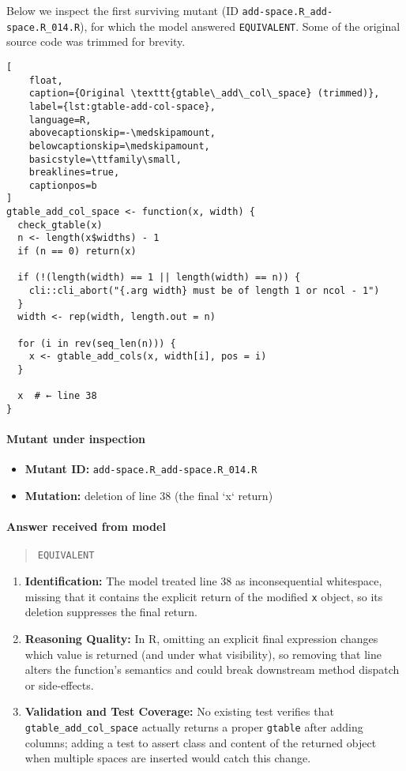 Below we inspect the first surviving mutant (ID \texttt{add-space.R\_add-space.R\_014.R}), for which the model answered \texttt{EQUIVALENT}.  Some of the original source code was trimmed for brevity.

\begin{lstlisting}[
    float,
    caption={Original \texttt{gtable\_add\_col\_space} (trimmed)},
    label={lst:gtable-add-col-space},
    language=R,
    abovecaptionskip=-\medskipamount,
    belowcaptionskip=\medskipamount,
    basicstyle=\ttfamily\small,
    breaklines=true,
    captionpos=b
]
gtable_add_col_space <- function(x, width) {
  check_gtable(x)
  n <- length(x$widths) - 1
  if (n == 0) return(x)

  if (!(length(width) == 1 || length(width) == n)) {
    cli::cli_abort("{.arg width} must be of length 1 or ncol - 1")
  }
  width <- rep(width, length.out = n)

  for (i in rev(seq_len(n))) {
    x <- gtable_add_cols(x, width[i], pos = i)
  }

  x  # ← line 38
}
\end{lstlisting}

\paragraph{Mutant under inspection}
\begin{itemize}
  \item \textbf{Mutant ID:} \texttt{add-space.R\_add-space.R\_014.R}
  \item \textbf{Mutation:} deletion of line 38 (the final `x` return)
\end{itemize}

\paragraph{Answer received from model}
\begin{quote}
\texttt{EQUIVALENT}
\end{quote}

\begin{enumerate}
  \item \textbf{Identification:}  
    The model treated line 38 as inconsequential whitespace, missing that it contains the explicit return of the modified \texttt{x} object, so its deletion suppresses the final return.

  \item \textbf{Reasoning Quality:}  
    In R, omitting an explicit final expression changes which value is returned (and under what visibility), so removing that line alters the function’s semantics and could break downstream method dispatch or side‐effects.

  \item \textbf{Validation and Test Coverage:}  
    No existing test verifies that \texttt{gtable\_add\_col\_space} actually returns a proper \texttt{gtable} after adding columns; adding a test to assert class and content of the returned object when multiple spaces are inserted would catch this change.
\end{enumerate}

